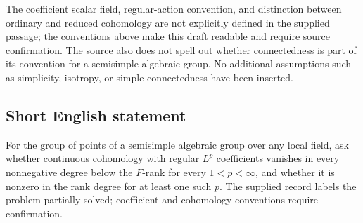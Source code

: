 \documentclass[11pt]{article}
\begin{document}
The coefficient scalar field, regular-action convention, and distinction between ordinary and reduced cohomology are not explicitly defined in the supplied passage; the conventions above make this draft readable and require source confirmation. The source also does not spell out whether connectedness is part of its convention for a semisimple algebraic group. No additional assumptions such as simplicity, isotropy, or simple connectedness have been inserted.
\subsection{Short English statement}
For the group of points of a semisimple algebraic group over any local field, ask whether continuous cohomology with regular \(L^p\) coefficients vanishes in every nonnegative degree below the \(F\)-rank for every \(1<p<\infty\), and whether it is nonzero in the rank degree for at least one such \(p\). The supplied record labels the problem partially solved; coefficient and cohomology conventions require confirmation.
\end{document}
